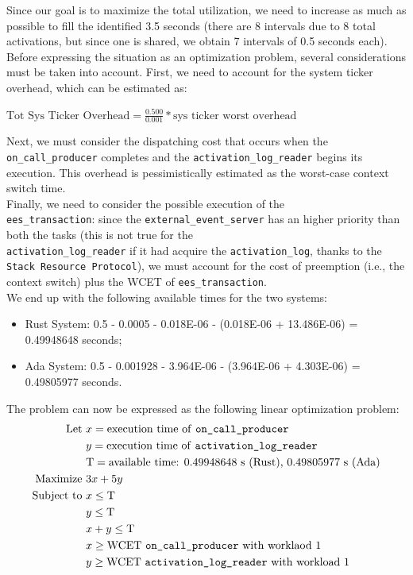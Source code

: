 Since our goal is to maximize the total utilization, we need to
increase as much as possible to fill the identified 3.5 seconds 
(there are 8 intervals due to 8 total activations, but since one is shared, we
obtain 7 intervals of 0.5 seconds each). \\
Before expressing the situation as an optimization problem, several
considerations must be taken into account. First, we need to account for the system
ticker overhead, which can be estimated as:
\centerline{$\text{Tot Sys Ticker Overhead} =
\frac{0.500}{0.001}*\text{sys ticker worst overhead}$} 
\noindent Next, we must consider the dispatching cost that occurs when the
\texttt{on\_call\_producer} completes and the \texttt{activation\_log\_reader}
begins its execution. This overhead is pessimistically estimated as 
the worst-case context switch time. \\
Finally, we need to consider the possible execution of the \\
\texttt{ees\_transaction}: since the \texttt{external\_event\_server} has an
higher priority than both the tasks (this is not true for the \\
\texttt{activation\_log\_reader} if it had acquire the 
\texttt{activation\_log}, thanks to the \texttt{Stack Resource Protocol}), we
must account for the cost of preemption (i.e., the context 
switch) plus the WCET of \texttt{ees\_transaction}. \\
We end up with the following available times for the two systems:
\begin{itemize}
  \item Rust System: 0.5 - 0.0005 - 0.018E-06 - (0.018E-06 + 13.486E-06) =
  0.49948648 seconds;
  \item Ada System: 0.5 - 0.001928 - 3.964E-06 - (3.964E-06 + 4.303E-06) =
  0.49805977 seconds.
\end{itemize}
The problem can now be expressed as the following linear optimization problem:
\begin{align*}
  \text{Let } & x = \text{execution time of \texttt{on\_call\_producer}} \\
            & y = \text{execution time of \texttt{activation\_log\_reader}} \\
            & \text{T} = \text{available time: 0.49948648 s (Rust), 0.49805977 s (Ada)} \\ 
  \text{Maximize } & 3x + 5y \\
  \text{Subject to } & x \leq \text{T} \\
                      & y \leq \text{T} \\
                      & x + y \leq \text{T} \\
                      & x \geq \text{WCET \texttt{on\_call\_producer} with worklaod 1} \\
                      & y \geq \text{WCET \texttt{activation\_log\_reader} with workload 1} 
\end{align*} 
